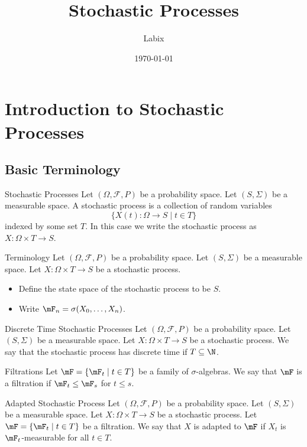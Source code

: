 \documentclass[a4paper]{article}
\title{Stochastic Processes}
\author{Labix}
\date{\today}
\begin{document}
\maketitle
\begin{abstract}
\end{abstract}
\tableofcontents

\pagebreak
\section{Introduction to Stochastic Processes}
\subsection{Basic Terminology}
\begin{defn}{Stochastic Processes}{} Let $(\Omega,\mathcal{F},P)$ be a probability space. Let $(S,\Sigma)$ be a measurable space. A stochastic process is a collection of random variables $$\{X(t):\Omega\to S\;|\;t\in T\}$$ indexed by some set $T$. In this case we write the stochastic process as $X:\Omega\times T\to S$. 
\end{defn}

\begin{defn}{Terminology}{} Let $(\Omega,\mathcal{F},P)$ be a probability space. Let $(S,\Sigma)$ be a measurable space. Let $X:\Omega\times T\to S$ be a stochastic process. 
\begin{itemize}
\item Define the state space of the stochastic process to be $S$. 
\item Write $\mF_n=\sigma(X_0,\dots,X_n)$. 
\end{itemize}
\end{defn}

\begin{defn}{Discrete Time Stochastic Processes}{} Let $(\Omega,\mathcal{F},P)$ be a probability space. Let $(S,\Sigma)$ be a measurable space. Let $X:\Omega\times T\to S$ be a stochastic process. We say that the stochastic process has discrete time if $T\subseteq\N$. 
\end{defn}

\begin{defn}{Filtrations}{} Let $\mF=\{\mF_t\;|\;t\in T\}$ be a family of $\sigma$-algebras. We say that $\mF$ is a filtration if $\mF_t\leq\mF_s$ for $t\leq s$. 
\end{defn}

\begin{defn}{Adapted Stochastic Process}{} Let $(\Omega,\mathcal{F},P)$ be a probability space. Let $(S,\Sigma)$ be a measurable space. Let $X:\Omega\times T\to S$ be a stochastic process. Let $\mF=\{\mF_t\;|\;t\in T\}$ be a filtration. We say that $X$ is adapted to $\mF$ if $X_t$ is $\mF_t$-measurable for all $t\in T$. 
\end{defn}
\end{document}
